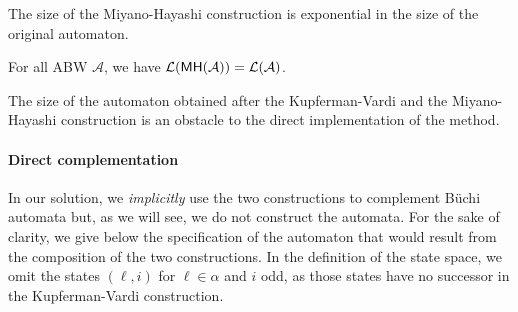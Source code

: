 \documentclass{LMCS}
\renewcommand{\l}{{\ell}}
\newcommand{\A}{\mathcal{A}}
\renewcommand{\L}{\mathcal{L}}
\newcommand{\MH}{{\sf MH}}
\begin{document}
The size of the Miyano-Hayashi construction is exponential in the 
size of the original automaton. 

\begin{thm}\label{theo:subset-construction}
For all ABW $\A$, we have $\L(\MH(\A)) = \L(\A)$.
\end{thm}

The size of the automaton obtained after the Kupferman-Vardi
and the Miyano-Hayashi construction is an obstacle to the
direct implementation of the method.  


\paragraph{{\bf Direct complementation}}\label{sec:direct-complementation}
In our solution, we \emph{implicitly} use the two constructions to
complement B\"uchi automata but, as we will see, we do not construct
the automata. For the sake of clarity, we give below the
specification of the automaton that would result from the composition of
the two constructions. In the definition of the state space, we omit the
states $(\l,i)$ for $\l \in \alpha$ and $i$ odd, as those states have no 
successor in the Kupferman-Vardi construction.
 
\end{document}

